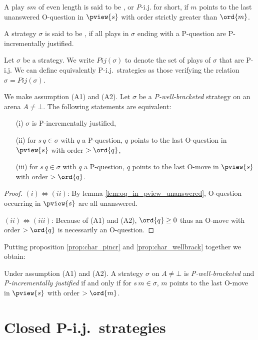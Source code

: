 \begin{definition}\rm
A play $s m$ of even length is said to be , or {\emph P-i.j.} for short, if $m$ points to the last unanswered O-question in $\pview{s}$ with order strictly greater than $\ord{m}$.

 A strategy $\sigma$ is said to be , if all plays in $\sigma$ ending with a P-question are
P-incrementally justified.
\end{definition}
Let $\sigma$ be a strategy. We write $Pij(\sigma)$ to denote the set of plays of $\sigma$ that are P-i.j.
We can define equivalently P-i.j.\ strategies as those verifying the relation $\sigma = Pij(\sigma)$.
\begin{proposition}
\label{prop:char_pincr}
\rm We make assumption (A1) and (A2).
Let $\sigma$ be a \emph{P-well-bracketed} strategy on an arena $A\neq \bot$.
The following statements are equivalent:
\begin{enumerate}
\item[(i)] $\sigma$ is P-incrementally justified,
\item[(ii)] for $s \, q \in \sigma$ with $q$ a P-question, $q$ points to the last O-question in $\pview{s}$ with order $>\ord{q}$,
\item[(iii)] for $s \, q \in \sigma$ with $q$ a P-question, $q$ points to the last O-move in $\pview{s}$ with order $>\ord{q}$.
\end{enumerate}
\end{proposition}
\begin{proof}
$(i)\iff(ii)$: By lemma \ref{lem:oq_in_pview_unanswered}, O-question occurring in $\pview{s}$ are all unanswered.

$(ii)\iff(iii)$: Because of (A1) and (A2), $\ord{q} \geq 0$ thus an O-move with order $>\ord{q}$ is necessarily an O-question.
\end{proof}

Putting proposition \ref{prop:char_pincr} and
\ref{prop:char_wellbrack} together we obtain:
\begin{proposition}
Under assumption (A1) and (A2).
A strategy $\sigma$ on $A\neq \bot$
is \emph{P-well-bracketed} and
 \emph{P-incrementally justified} if and only if
for $s \, m \in \sigma$, $m$ points to the last O-move in $\pview{s}$ with order $>\ord{m}$.
\end{proposition}




\section{Closed P-i.j.\ strategies}
\label{sec:closedpij}

